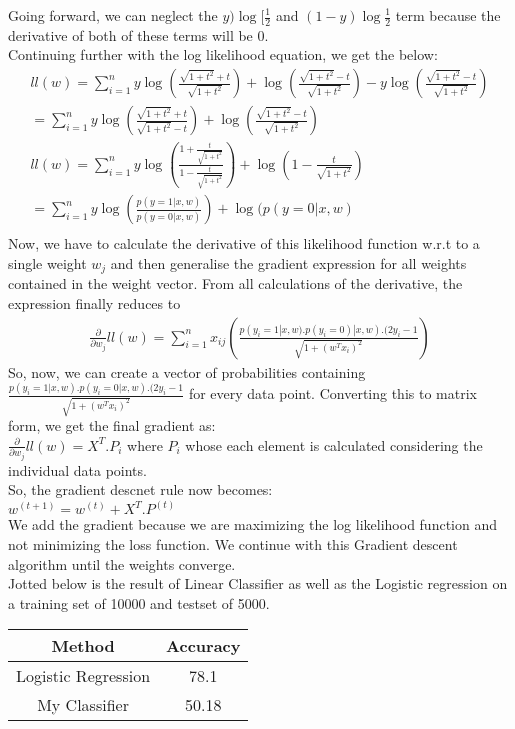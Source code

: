 \documentclass[11pt]{article}
\begin{document}
Going forward, we can neglect the $y)\log[\frac{1}{2}$ and $(1-y)\log\frac{1}{2}$ term because the derivative of both of these terms will be 0.\\
Continuing further with the log likelihood equation, we get the below:\\
\begin{align*}
ll(w)=\sum_{i=1}^n  y \log (\frac{\sqrt{1+t^2}+t}{\sqrt{1 + t^2}}) + \log (\frac{\sqrt{1+t^2}-t}{\sqrt{1 + t^2}}) -y \log (\frac{\sqrt{1+t^2}-t}{\sqrt{1 + t^2}})\\
= \sum_{i=1}^n y \log (\frac{\sqrt{1+t^2}+t}{\sqrt{1+t^2}-t}) + \log (\frac{\sqrt{1+t^2}-t}{\sqrt{1 + t^2}}) \\
ll(w)= \sum_{i=1}^n  y \log(\frac{1+\frac{t}{\sqrt{1+t^2}}}{1-\frac{t}{\sqrt{1+t^2}}}) + \log(1-\frac{t}{\sqrt{1+t^2}})\\
=\sum_{i=1}^n  y \log(\frac{p(y=1|x,w)}{p(y=0|x,w)}) + \log(p(y=0|x,w)\\
\end{align*}
Now, we have to calculate the derivative of this likelihood function w.r.t to a single weight $w_j$ and then generalise the gradient expression for all weights contained in the weight vector. From all calculations of the derivative, the expression finally reduces to\\
\begin{align*}
\frac{\partial}{\partial w_j}ll(w)=\sum_{i=1}^n x_{ij}(\frac{p(y_i=1|x,w).p(y_i=0)|x,w).(2y_i-1}{\sqrt{1+(w^Tx_i)^2}})
\end{align*}
So, now, we can create a vector of probabilities containing $\frac{p(y_i=1|x,w).p(y_i=0|x,w).(2y_i-1}{\sqrt{1+(w^Tx_i)^2}}$ for every data point. Converting this to matrix form, we get the final gradient as:\\
$\frac{\partial}{\partial w_j}ll(w)=X^T.P_i$ where $P_i$ whose each element is calculated considering the individual data points.\\
So, the gradient descnet rule now becomes:\\
$w^{(t+1)}=w^{(t)} + X^T.P^{(t)}$ \\
We add the gradient because we are maximizing the log likelihood function and not minimizing the loss function. We continue with this Gradient descent algorithm until the weights converge.\\
Jotted below is the result of Linear Classifier as well as the Logistic regression on a training set of 10000 and testset of 5000.\\
\begin{tabular}{|c|c|}
\hline 
Method & Accuracy \\ 
\hline 
Logistic Regression & 78.1 \\ 
\hline 
My Classifier & 50.18 \\ 
\hline 
\end{tabular}\\
 
\end{document}
